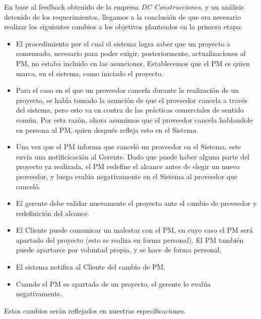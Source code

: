 En base al feedback obtenido de la empresa \textit{DC Construcciones}, y un análisis detenido de los requerimientos, llegamos a la conclusión de que era necesario realizar los siguientes cambios a los objetivos planteados en la primera etapa:

\begin{itemize}
  \item El procedimiento por el cual el sistema logra saber que un proyecto a comenzado, necesario para poder exigir, posteriormente, actualizaciones al PM, no estaba incluido en las asunciones. Establecemos que el PM es quien marca, en el sistema, como iniciado el proyecto.
  \item Para el caso en el que un proveedor cancela durante la realización de un proyecto, se había tomado la asunción de que el proveedor cancela a través del sistema, pero esto va en contra de las prácticas comerciales de sentido común. Por esta razón, ahora asumimos que el proveedor cancela hablandole en persona al PM, quien después refleja esto en el Sistema.
  \item Una vez que el PM informa que canceló un proveedor en el Sistema, este envía una notificicación al Gerente. Dado que puede haber alguna parte del proyecto ya realizada, el PM redefine el alcance antes de elegir un nuevo proveedor, y luego evalúa negativamente en el Sistema al proveedor que canceló.
  \item El gerente debe validar nuevamente el proyecto ante el cambio de proveedor y redefinición del alcance.
  \item El Cliente puede comunicar un malestar con el PM, en cuyo caso el PM será apartado del proyecto (esto se realiza en forma personal). El PM también puede apartarce por voluntad propia, y se hace de forma personal.
  \item El sistema notifica al Cliente del cambio de PM.
  \item Cuando el PM es apartado de un proyecto, el gerente lo evalúa negativamente.

\end{itemize}

Estos cambios serán reflejados en nuestras especificaciones.
